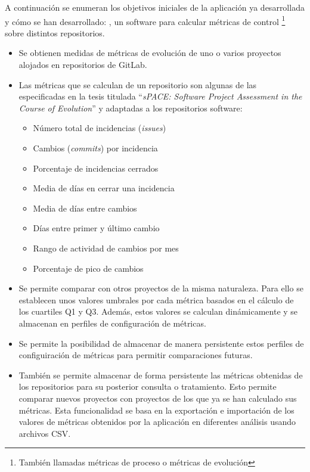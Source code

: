 A continuación se enumeran los objetivos iniciales de la aplicación ya desarrollada y cómo se han desarrollado: \cite{TFGPrevio}, un software para calcular métricas de control \footnote{También llamadas métricas de proceso o métricas de evolución} sobre distintos repositorios.
\begin{itemize}
	\tightlist
	\item Se obtienen medidas de métricas de evolución de uno o varios proyectos alojados en repositorios de GitLab.
	\item Las métricas que se calculan de un repositorio  son algunas de las especificadas en la tesis titulada ``\textit{sPACE: Software Project Assessment in the Course of Evolution}'' \cite{ratzinger_space:_2007} y 
	adaptadas a los repositorios software:
	\begin{itemize}
		\tightlist
		\item Número total de incidencias (\textit{issues})
		\item Cambios (\textit{commits}) por incidencia
		\item Porcentaje de incidencias cerrados
		\item Media de días en cerrar una incidencia
		\item Media de días entre cambios
		\item Días entre primer y último cambio
		\item Rango de actividad de cambios por mes
		\item Porcentaje de pico de cambios
	\end{itemize}
	\item Se permite comparar con otros proyectos de la misma naturaleza. Para ello se establecen unos valores umbrales por cada métrica basados en el cálculo de los cuartiles Q1 y Q3. Además, estos valores se calculan dinámicamente y se almacenan en perfiles de configuración de métricas.
	\item Se permite la posibilidad de almacenar de manera persistente estos perfiles de configuiración de métricas para permitir comparaciones futuras.
	\item También se permite almacenar de forma persistente las métricas obtenidas de los repositorios para su posterior consulta o tratamiento. Esto permite comparar nuevos proyectos con proyectos de los que ya se han calculado sus métricas.
	 Esta funcionalidad se basa en la exportación e importación de los valores de métricas obtenidos por la aplicación en diferentes análisis usando archivos CSV.
\end{itemize}

